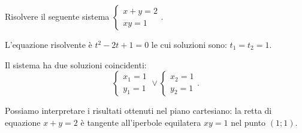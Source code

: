 \begin{esempio}
Risolvere il seguente sistema 
$\left\{\begin{array}{l}{x+y=2}\\{xy=1}\end{array}\right.$.
\begin{multicols}{2}
L'equazione risolvente è $t^2-2t+1=0$ le cui soluzioni sono: $t_1=t_2=1$.

Il sistema ha due soluzioni coincidenti: \[ 
\left\{\begin{array}{l}{x_1=1}\\{y_1=1}\end{array}\right.\vee 
\left\{\begin{array}{l}{x_2=1}\\{y_2=1}\end{array}\right.. \]

Possiamo interpretare i risultati ottenuti nel piano cartesiano: la retta di 
equazione $x+y=2$ è tangente all'iperbole equilatera $xy=1$ nel punto $(1;1)$.
\begin{center}

\end{center}
\end{multicols}
\end{esempio}
% 
% 
% 
% 
